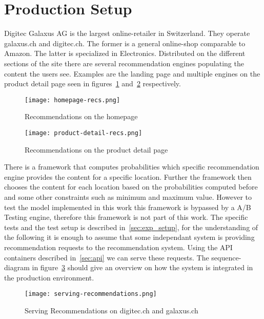 \section{Production Setup}
Digitec Galaxus AG is the largest online-retailer in Switzerland.
They operate galaxus.ch and digitec.ch. The former is a general online-shop comparable to Amazon. 
The latter is specialized in Electronics.
Distributed on the different sections of the site there are several recommendation engines populating the content the users see.
Examples are the landing page and multiple engines on the product detail page seen in figures~\ref{fig:homepage_recs} and~\ref{fig:product_detail_recs} respectively.

\begin{figure}[ht]
	\centering
	\captionsetup{width=0.8\textwidth}
    \texttt{[image: homepage-recs.png]}
    \caption{Recommendations on the homepage}
    \label{fig:homepage_recs}
\end{figure}

\begin{figure}[ht]
	\centering
	\captionsetup{width=0.8\textwidth}
    \texttt{[image: product-detail-recs.png]}
    \caption{Recommendations on the product detail page}
    \label{fig:product_detail_recs}
\end{figure}

There is a framework that computes probabilities which specific recommendation engine provides the content for a specific location.
Further the framework then chooses the content for each location based on the probabilities computed before and some other constraints such as minimum and maximum value.
However to test the model implemented in this work this framework is bypassed by a A/B Testing engine, therefore this framework is not part of this work.
The specific tests and the test setup is described in~\ref{sec:exp_setup}, for the understanding of the following it is enough to assume that some independant system is providing recommendation requests to the recommendation system.
Using the API containers described in~\ref{sec:api} we can serve these requests.
The sequence-diagram in figure~\ref{fig:serving_recs} should give an overview on how the system is integrated in the production environment.

\begin{figure}[ht]
	\centering
	\captionsetup{width=0.8\textwidth}
    \texttt{[image: serving-recommendations.png]}
    \caption{Serving Recommendations on digitec.ch and galaxus.ch}
    \label{fig:serving_recs}
\end{figure}

